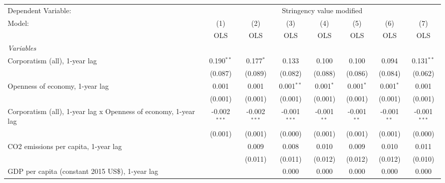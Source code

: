 
\begingroup
\centering
\begin{tabular}{lccccccc}
   \toprule
   Dependent Variable: & \multicolumn{7}{c}{Stringency value modified}\\
   Model:                                                          & (1)            & (2)            & (3)            & (4)           & (5)           & (6)           & (7)\\  
                                                                   &  OLS           & OLS            & OLS            & OLS           & OLS           & OLS           & OLS\\  
   \midrule
   \emph{Variables}\\
   Corporatism (all), 1-year lag                                   & 0.190$^{**}$   & 0.177$^{*}$    & 0.133          & 0.100         & 0.100         & 0.094         & 0.131$^{**}$\\   
                                                                   & (0.087)        & (0.089)        & (0.082)        & (0.088)       & (0.086)       & (0.084)       & (0.062)\\   
   Openness of economy, 1-year lag                                 & 0.001          & 0.001          & 0.001$^{**}$   & 0.001$^{*}$   & 0.001$^{*}$   & 0.001$^{*}$   & 0.001\\   
                                                                   & (0.001)        & (0.001)        & (0.001)        & (0.001)       & (0.001)       & (0.001)       & (0.001)\\   
   Corporatism (all), 1-year lag x Openness of economy, 1-year lag & -0.002$^{***}$ & -0.002$^{***}$ & -0.001$^{***}$ & -0.001$^{**}$ & -0.001$^{**}$ & -0.001$^{**}$ & -0.001$^{***}$\\   
                                                                   & (0.001)        & (0.001)        & (0.000)        & (0.001)       & (0.001)       & (0.001)       & (0.000)\\   
   CO2 emissions per capita, 1-year lag                            &                & 0.009          & 0.008          & 0.010         & 0.009         & 0.010         & 0.011\\   
                                                                   &                & (0.011)        & (0.011)        & (0.012)       & (0.012)       & (0.012)       & (0.010)\\   
   GDP per capita (constant 2015 US\$), 1-year lag                 &                &                & 0.000          & 0.000         & 0.000         & 0.000         & 0.000\\   

\end{tabular}
